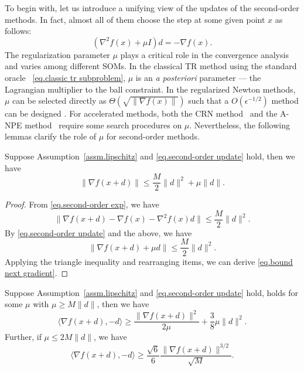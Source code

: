 \documentclass{mcom-l}
\numberwithin{equation}{section}
\begin{document}
To begin with, let us introduce a unifying view of the updates of the second-order methods. In fact, almost all of them choose the step at some given point $x$ as follows:
\begin{equation}
    \label{eq.second-order update}
    \left (\nabla^2 f(x) + \mu I \right )d = -\nabla f(x).
\end{equation}
The regularization parameter $\mu$ plays a critical role in the convergence analysis and varies among different SOMs.
In the classical TR method using the standard oracle ~\eqref{eq.classic tr subproblem}, $\mu$ is an \emph{a posteriori} parameter --- the Lagrangian multiplier to the ball constraint.
In the regularized Newton methods, $\mu$ can be selected directly as $\Theta(\sqrt{\|\nabla f(x)\|})$ such that a $O(\epsilon^{-1/2})$ method can be designed \cite{mishchenko_regularized_2023}. For accelerated methods, both the CRN method~\cite{nesterov2008accelerating} and the A-NPE method~\cite{monteiro2013accelerated} require some search procedures on $\mu$. Nevertheless, the following lemmas clarify the role of $\mu$ for second-order methods.
\begin{lemma}
    \label{lem.bound next gradient}
    Suppose Assumption~\ref{assm.lipschitz} and \eqref{eq.second-order update} hold, then we have
    \begin{equation}
        \label{eq.bound next gradient}
        \|\nabla f(x+d)\| \leq \frac{M}{2}\|d\|^2+\mu\|d\|.
    \end{equation}
\end{lemma}
\begin{proof}
    From \eqref{eq.second-order exp}, we have
    \begin{equation*}
        \|\nabla f(x+d)- \nabla f(x) -\nabla ^2 f(x) d\| \leq \frac{M}{2}\|d\|^2.
    \end{equation*}
    By \eqref{eq.second-order update} and the above, we have
    \begin{equation}\label{eq.bounded by squared step}
        \|\nabla f(x+d)+\mu d\| \leq \frac{M}{2}\|d\|^2.
    \end{equation}
    Applying the triangle inequality and rearranging items, we can derive \eqref{eq.bound next gradient}.
\end{proof}
\begin{lemma}
    \label{lem.inner product g and d}
    Suppose Assumption~\ref{assm.lipschitz} and \eqref{eq.second-order update} hold,
    holds for some $\mu$ with $\mu\geq M \|d\|$, then we have
    \begin{equation}
        \label{eq.inner product g d}
        \langle \nabla f(x+d),-d \rangle \geq \frac{\|\nabla f(x+d)\|^2}{2\mu}+\frac{3}{8}\mu \|d\|^2.
    \end{equation}
    Further, if $\mu \leq 2M\|d\|$, we have
    \begin{equation}
        \label{eq.inner product g d advanced}
        \langle \nabla f(x+d),-d \rangle \geq \frac{\sqrt{6}}{6} \frac{\|\nabla f(x+d)\|^{3/2}}{\sqrt{M}}.
    \end{equation}
\end{lemma}
\end{document}
